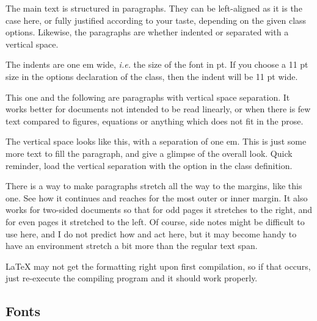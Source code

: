 \documentclass[
	raggedright,
	12pt,
	colorful,
]{tufte-style-article}
\begin{document}
The main text is structured in paragraphs. They can be left-aligned as it is the case here, or fully justified according to your taste, depending on the given class options. Likewise, the paragraphs are whether indented or separated with a vertical space.

The indents are one em wide, \textit{i.e.} the size of the font in pt. If you choose a 11 pt size in the options declaration of the class, then the indent will be 11 pt wide.

\begingroup
\setlength{\parindent}{0em}
\setlength{\parskip}{1em}
This one and the following are paragraphs with vertical space separation. It works better for documents not intended to be read linearly, or when there is few text compared to figures, equations or anything which does not fit in the prose.

The vertical space looks like this, with a separation of one em. This is just some more text to fill the paragraph, and give a glimpse of the overall look. Quick reminder, load the vertical separation with the  option in the class definition.
\endgroup

\begin{wide}
\hspace{1em}
There is a way to make paragraphs stretch all the way to the margins, like this one.	See how it continues and reaches for the most outer or inner margin. It also works for two-sided documents so that for odd pages it stretches to the right, and for even pages it stretched to the left. Of course, side notes might be difficult to use here, and I do not predict how  and   act here, but it may become handy to have an environment stretch a bit more than the regular text span.


\LaTeX{} may not get the formatting right upon first compilation, so if that occurs, just re-execute the compiling program and it should work properly.
\end{wide}


\subsection{Fonts}
\end{document}
